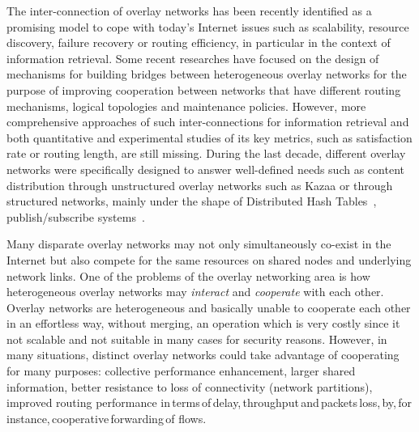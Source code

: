 
%
%
The inter-connection of overlay networks has been recently identified
as a promising model to cope with today's Internet issues such as
scalability, resource discovery, failure recovery or routing
efficiency, in particular in the context of information
retrieval. Some recent researches have focused on the design of
mechanisms for building bridges between heterogeneous overlay networks
for the purpose of improving cooperation between networks that have
different routing mechanisms, logical topologies and maintenance
policies. However, more comprehensive approaches of such
inter-connections for information retrieval and both quantitative and
experimental studies of its key metrics, such as satisfaction rate or
routing length, are still missing. During the last decade, different
overlay networks were specifically designed to answer well-defined
needs such as content distribution through unstructured overlay
networks such as Kazaa or through structured networks, mainly under
the shape of Distributed Hash Tables~\cite{CAN,Chord,Pastry},
publish/subscribe systems~\cite{castro_scribe:large-scale_2002,
  LBCC08}.


%
Many disparate overlay networks may not only simultaneously co-exist
in the Internet but also compete for the same resources on shared
nodes and underlying network links. One of the problems of the overlay
networking area is how heterogeneous overlay networks may
\emph{interact} and \emph{cooperate} with each other. Overlay networks
are heterogeneous and basically unable to coo\-perate each other in an
effortless way, without merging, an operation which is very costly
since it not scalable and not suitable in many cases for security
reasons.  However, in many situations, distinct overlay networks could
take advantage of cooperating for many purposes: collective
performance enhancement, larger shared information, better resistance
to loss of connectivity (network partitions), improved routing
performance
in\,terms\,of\,delay,\,throughput\,and\,packets\,loss,\,by,\,for
instance,\,cooperative\,forwarding\,of flows.


